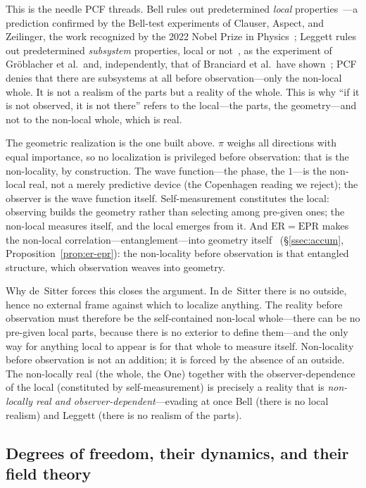 This is the needle PCF threads. Bell rules out predetermined \emph{local} properties~\cite{Bell64}---a prediction confirmed by the Bell-test experiments of Clauser, Aspect, and Zeilinger, the work recognized by the 2022 Nobel Prize in Physics~\cite{FreedmanClauser72,Aspect82,Weihs98,Nobel2022}; Leggett rules out predetermined \emph{subsystem} properties, local or not~\cite{Leggett03}, as the experiment of Gr\"oblacher et al.\ and, independently, that of Branciard et al.\ have shown~\cite{Groblacher07,Branciard07}; PCF denies that there are subsystems at all before observation---only the non-local whole. It is not a realism of the parts but a reality of the whole. This is why ``if it is not observed, it is not there'' refers to the local---the parts, the geometry---and not to the non-local whole, which is real.

The geometric realization is the one built above. $\pi$ weighs all directions with equal importance, so no localization is privileged before observation: that is the non-locality, by construction. The wave function---the phase, the $1$---is the non-local real, not a merely predictive device (the Copenhagen reading we reject); the observer is the wave function itself. Self-measurement constitutes the local: observing builds the geometry rather than selecting among pre-given ones; the non-local measures itself, and the local emerges from it. And $\mathrm{ER}=\mathrm{EPR}$ makes the non-local correlation---entanglement---into geometry itself~\cite{MaldacenaSusskind13} (\S\ref{ssec:accum}, Proposition~\ref{prop:er-epr}): the non-locality before observation is that entangled structure, which observation weaves into geometry.

Why de~Sitter forces this closes the argument. In de~Sitter there is no outside, hence no external frame against which to localize anything. The reality before observation must therefore be the self-contained non-local whole---there can be no pre-given local parts, because there is no exterior to define them---and the only way for anything local to appear is for that whole to measure itself. Non-locality before observation is not an addition; it is forced by the absence of an outside. The non-locally real (the whole, the One) together with the observer-dependence of the local (constituted by self-measurement) is precisely a reality that is \emph{non-locally real and observer-dependent}---evading at once Bell (there is no local realism) and Leggett (there is no realism of the parts).

\subsection{Degrees of freedom, their dynamics, and their field theory}\label{ssec:disc-dof}

